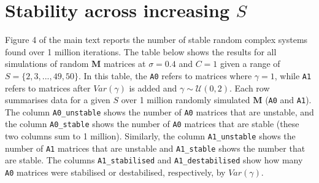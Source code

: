 \documentclass[]{article}
\begin{document}
\hypertarget{IncrS}{%
\section{\texorpdfstring{Stability across increasing
\(S\)}{Stability across increasing S}}\label{IncrS}}

Figure 4 of the main text reports the number of stable random complex
systems found over 1 million iterations. The table below shows the
results for all simulations of random \(\mathbf{M}\) matrices at
\(\sigma = 0.4\) and \(C = 1\) given a range of
\(S = \{2, 3, ..., 49, 50\}\). In this table, the \texttt{A0} refers to
matrices where \(\gamma = 1\), while \texttt{A1} refers to matrices
after \(Var(\gamma)\) is added and \(\gamma \sim \mathcal{U}(0, 2)\).
Each row summarises data for a given \(S\) over 1 million randomly
simulated \(\mathbf{M}\) (\texttt{A0} and \texttt{A1}). The column
\texttt{A0\_unstable} shows the number of \texttt{A0} matrices that are
unstable, and the column \texttt{A0\_stable} shows the number of
\texttt{A0} matrices that are stable (these two columns sum to 1
million). Similarly, the column \texttt{A1\_unstable} shows the number
of \texttt{A1} matrices that are unstable and \texttt{A1\_stable} shows
the number that are stable. The columns \texttt{A1\_stabilised} and
\texttt{A1\_destabilised} show how many \texttt{A0} matrices were
stabilised or destabilised, respectively, by \(Var(\gamma)\).
\end{document}
